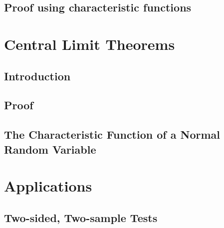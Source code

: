 \documentclass[10pt,a4paper]{book}
\begin{document}
	\section{Proof using characteristic functions}
	
	\chapter{Central Limit Theorems}
	\section{Introduction}
	\section{Proof}
	\section{The Characteristic Function of a Normal Random Variable}
	
	\chapter{Applications}
	\section{Two-sided, Two-sample Tests}
	
\end{document}
